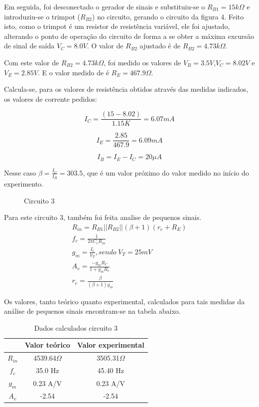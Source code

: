 \documentclass[a4paper]{article} %
\begin{document}
Em seguida, foi desconectado o gerador de sinais e substituiu-se o $R_{B1}=15k\Omega$
e introduziu-se o trimpot ($R_{B2}$) no circuito, gerando o circuito da figura 4. Feito isto,
como o trimpot é um resistor de resistência variável, ele foi ajustado, alterando o
ponto de operação do circuito de forma a se obter a máxima excursão de sinal de saída
$V_C=8.0V$. O valor de $R_{B2}$ ajustado é de $R_{B2}=4.73k\Omega$.

Com este valor de $R_{B2}=4.73k\Omega$, foi medido os valores de
$V_B=3.5V$,$V_C=8.02V$ e $V_E=2.85V$. E o valor medido de é $R_E=467.9\Omega$.

Calcula-se, para os valores de resistência obtidos através das medidas indicados, os
valores de corrente pedidos:

\begin{displaymath}
I_C =\frac{(15-8.02)}{1.15K} = 6.07 mA
\end{displaymath}

\begin{displaymath}
I_E =\frac{2.85}{467.9} = 6.09 mA
\end{displaymath}

\begin{displaymath}
I_B = I_E - I_C = 20 \mu A
\end{displaymath}

Nesse caso $\beta = \frac{I_C}{I_B} = 303.5$, que é um valor próximo do valor medido no início do
experimento.


\vspace{3mm}
\begin{figure}[h!]
\centerline{}
\caption{Circuito 3\label{circ:3}}
\end{figure}


Para este circuito 3, também foi feita analise de pequenos sinais.
\begin{eqnarray}
R_{in}=R_{B1}||R_{B2}||(\beta+1)(r_{e}+R_E)\\
f_c=\frac{1}{2\pi C_cR_{in}}\\
g_m=\frac{I_c}{V_T},sendo \; V_T = 25 mV\\
A_v=\frac{-g_mR_C}{1+g_mR_e}\\
r_{e}=\frac{\beta}{(\beta+1)g_m}
\end{eqnarray}


%
Os valores, tanto teórico quanto experimental, calculados para tais medidas da análise
de pequenos sinais encontram-se na tabela abaixo.
\begin{table}[h!]
\begin{centering}
\begin{tabular}{ccc}
\hline 
 & Valor teórico & Valor experimental\tabularnewline
\hline
\hline 
$R_{in}$ & 4539.64$\Omega$ & 3505.31$\Omega$\tabularnewline
$f_{c}$ & 35.0 Hz & 45.40 Hz\tabularnewline
$g_{m}$ & 0.23 A/V & 0.23 A/V\tabularnewline
$A_{v}$ & -2.54 & -2.54\tabularnewline
\hline
\end{tabular}
\par\end{centering}

\caption{Dados calculados circuito 3}

\end{table}
\end{document}
